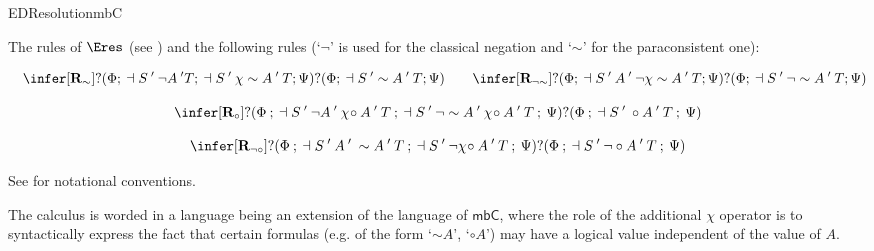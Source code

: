 \begin{entry}{EDResolutionmbC}  



\begin{calculus}

The rules of $\Eres$ (see ) and the following rules (`$\lnot$' is used for the classical negation and `$\sim$' for the paraconsistent one):

\vspace{-0.3cm}

$$
\quad
\infer[\textbf{R}_{\sim }]
{?(\Phi;\:\dashv S\:'\:\neg A\:' T;\:\dashv S\:'\:\chi\sim A\:'\:T;\Psi)}
{?(\Phi;\:\dashv S\:' \sim A\:'\:T;\Psi)}
\qquad
\infer[\textbf{R}_{\neg\sim}]
{?(\Phi;\:\dashv S\:'\:A\:'\:\neg\chi\sim A\:'\:T;\Psi)}
{?(\Phi;\:\dashv S\:'\:\neg\sim A\:'\:T;\Psi)}$$

\vspace{-0.5cm}

$$\infer[\textbf{R}_{\circ}]
{?(\Phi\:;\:\dashv S\:'\:\neg A\:'\:\chi\!\circ A\:'\:T\:;\:\dashv S\:'\:\neg\sim A\:'\:\chi\!\circ A\:'\:T\:;\:\Psi)}
{?(\Phi\:;\:\dashv S\:'\:\circ A\:'\:T\:;\:\Psi)}$$

\vspace{-0.3cm}

$$\infer[\textbf{R}_{\neg\circ}]
{?(\Phi\:;\:\dashv S\:'\:A\:'\:\sim A\:'\:T\:;\:\dashv S\:'\:\neg\chi\!\circ A\:'\:T\:;\:\Psi)}
{?(\Phi\:;\:\dashv S\:'\:\neg\circ A\:'\:T\:;\:\Psi)}$$
\end{calculus}


\begin{clarifications}
See  for notational conventions.

The calculus is worded in a language being an extension of the language of $\mathsf{mbC}$, where the role of the additional $\chi$ operator is to syntactically express the fact that certain formulas (e.g. of the form `$\sim A$', `$\circ A$') may have a logical value independent of the value of $A$.
\end{clarifications}


\end{entry}
